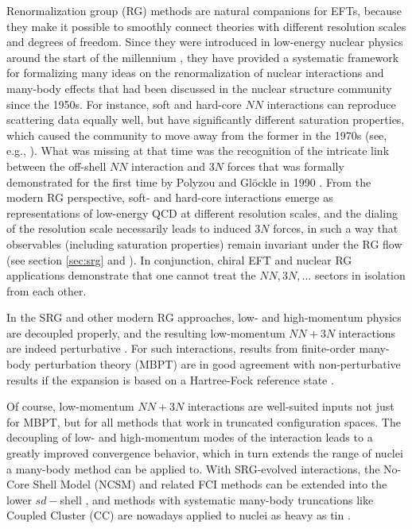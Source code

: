 Renormalization group (RG) methods are natural companions for
EFTs, because they make it possible to smoothly connect theories with 
different resolution scales and degrees of freedom. Since they 
were introduced in low-energy nuclear physics around the start 
of the millennium \cite{Bogner:2003os,Bogner:2007od,Bogner:2010pq,Furnstahl:2013zt}, 
they have provided a systematic framework for formalizing many ideas on the 
renormalization of nuclear interactions and many-body effects that had been 
discussed in the nuclear structure community since the 1950s. For instance,
soft and hard-core $NN$ interactions can reproduce scattering data equally
well, but have significantly different saturation properties, which caused
the community to move away from the former in the 1970s (see, e.g., \cite{Bethe:1971qf}).
What was missing at that time was the recognition of the intricate link
between the off-shell $NN$ interaction and $3N$ forces that was formally
demonstrated for the first time by Polyzou and Gl\"ockle in 1990 \cite{Polyzou:1990fk}.
From the modern RG perspective, soft- and hard-core interactions emerge
as representations of low-energy QCD at different resolution scales, 
and the dialing of the resolution scale necessarily leads to induced
$3N$ forces, in such a way that observables (including saturation
properties) remain invariant under the RG flow (see section \ref{sec:srg} 
and \cite{Bogner:2010pq,Furnstahl:2013zt}). In conjunction, chiral EFT
and nuclear RG applications demonstrate that one cannot treat the $NN, 3N, \ldots$
sectors in isolation from each other.

In the SRG and other
modern RG approaches, low- and high-momentum physics are decoupled properly,
and the resulting low-momentum $NN+3N$ interactions are indeed perturbative
 \cite{Bogner:2006qf,Bogner:2010pq}. For such interactions, results from 
finite-order many-body perturbation theory (MBPT) are in good agreement 
with non-perturbative results if the expansion is based on a Hartree-Fock 
reference state \cite{Tichai:2016vl,Roth:2010ys}.

Of course, low-momentum $NN+3N$ interactions are well-suited inputs not
just for MBPT, but for all methods that work in truncated configuration
spaces. The decoupling of low- and high-momentum modes of the interaction
leads to a greatly improved convergence behavior, which in turn extends 
the range of nuclei a many-body method can be applied to. With SRG-evolved
interactions, the No-Core Shell Model (NCSM) and related FCI methods can
be extended into the lower $sd-$shell 
\cite{Barrett:2013oq,Jurgenson:2013fk,Hergert:2013ij,Roth:2014fk}, and 
methods with systematic many-body truncations like Coupled Cluster (CC)
are nowadays applied to nuclei as heavy as tin \cite{Binder:2014fk,Hagen:2014ve,Hagen:2016rb}.

